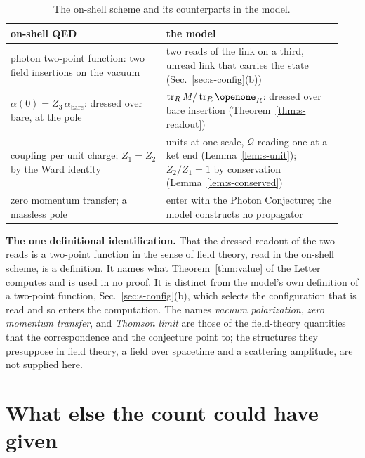 \begin{table}[h]
\caption{The on-shell scheme and its counterparts in the model.}
\label{tab:s-onshell}
\footnotesize
\begin{ruledtabular}
\begin{tabular}{>{\raggedright\arraybackslash}p{0.44\linewidth}>{\raggedright\arraybackslash}p{0.50\linewidth}}
on-shell QED & the model \\ \hline
photon two-point function: two field insertions on the vacuum & two reads of the link on a third, unread link that carries the state (Sec.~\ref{sec:s-config}(b)) \\
$\alpha(0)=Z_{3}\,\alpha_{\mathrm{bare}}$: dressed over bare, at the pole & $\tr_{R}M/\tr_{R}\openone_{R}$: dressed over bare insertion (Theorem~\ref{thm:s-readout}) \\
coupling per unit charge; $Z_{1}=Z_{2}$ by the Ward identity & units at one scale, $\mathcal{Q}$ reading one at a ket end (Lemma~\ref{lem:s-unit}); $Z_{2}/Z_{1}=1$ by conservation (Lemma~\ref{lem:s-conserved}) \\
zero momentum transfer; a massless pole & enter with the Photon Conjecture; the model constructs no propagator \\
\end{tabular}
\end{ruledtabular}
\end{table}



\textbf{The one definitional identification.} That the dressed readout of the two reads is a two-point function in the sense of field theory, read in the on-shell scheme, is a definition. It names what Theorem~\ref{thm:value} of the Letter computes and is used in no proof. It is distinct from the model's own definition of a two-point function, Sec.~\ref{sec:s-config}(b), which selects the configuration that is read and so enters the computation. The names \emph{vacuum polarization}, \emph{zero momentum transfer}, and \emph{Thomson limit} are those of the field-theory quantities that the correspondence and the conjecture point to; the structures they presuppose in field theory, a field over spacetime and a scattering amplitude, are not supplied here.

\section{What else the count could have given}
\label{sec:s-alternatives}

